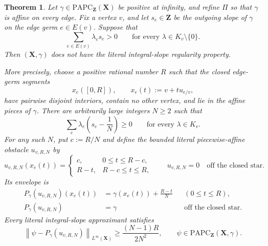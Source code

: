 \documentclass[11pt,a4paper]{article}
\newtheorem{theorem}{Theorem}[section]
\theoremstyle{definition}
\theoremstyle{remark}
\begin{document}
\begin{theorem}
\label{thm:frontier-polyhedral-strict-vertex-integral-nonregularity}
Let $\gamma\in\mathrm{PAPC}_{\mathbf Z}(\mathbf X)$ be positive at
infinity, and refine $\Pi$ so that $\gamma$ is affine on every edge.  Fix a
vertex $v$, and let $s_e\in\mathbf Z$ be the outgoing slope of $\gamma$ on
the edge germ $e\in E(v)$.  Suppose that
\begin{equation}
             \sum_{e\in E(v)}\lambda_es_e>0
             \qquad\text{for every }\lambda\in K_v\setminus\{0\}.
 \label{eq:frontier-polyhedral-strict-vertex}
\end{equation}
Then $(\mathbf X,\gamma)$ does not have the literal integral-slope
regularity property.

More precisely, choose a positive rational number $R$ such that the closed
edge-germ segments
\[
       x_e([0,R]),\qquad x_e(t):=v+tu_{e/v},
\]
have pairwise disjoint interiors, contain no other vertex, and lie in the
affine pieces of $\gamma$.  There are arbitrarily large integers $N\geq2$
such that
\begin{equation}
 \sum_e\lambda_e\left(s_e-\frac1N\right)\geq0
                 \qquad\text{for every }\lambda\in K_v.
 \label{eq:frontier-polyhedral-strict-vertex-choice}
\end{equation}
For any such $N$, put $c:=R/N$ and define the bounded literal
piecewise-affine obstacle $u_{v,R,N}$ by
\[
 u_{v,R,N}(x_e(t))=
 \begin{cases}
  c,&0\leq t\leq R-c,\\
  R-t,&R-c\leq t\leq R,
 \end{cases}
 \qquad
 u_{v,R,N}=0\quad\text{off the closed star}.
\]
Its envelope is
\begin{equation}
 \begin{aligned}
 P_\gamma(u_{v,R,N})(x_e(t))
   &=\gamma(x_e(t))+\frac{R-t}{N}
       &&(0\leq t\leq R),\\
 P_\gamma(u_{v,R,N})&=\gamma
       &&\text{off the closed star}.
 \end{aligned}
 \label{eq:frontier-polyhedral-strict-vertex-envelope}
\end{equation}
Every literal integral-slope approximant satisfies
\begin{equation}
 \left\lVert\psi-P_\gamma(u_{v,R,N})\right\rVert_{L^\infty(\mathbf X)}
 \geq \frac{(N-1)R}{2N^2},
 \qquad
 \psi\in\mathrm{PAPC}_{\mathbf Z}(\mathbf X,\gamma).
 \label{eq:frontier-polyhedral-strict-vertex-separation}
\end{equation}
\end{theorem}
\end{document}
